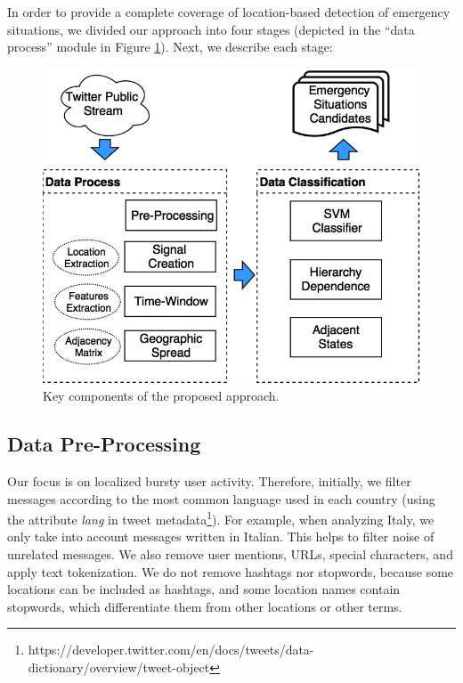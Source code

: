 \documentclass[sigconf]{acmart}
\begin{document}
In order to provide a complete coverage of location-based detection of emergency situations, we divided our approach into four stages (depicted in the ``data process'' module in Figure \ref{fig:diagram}). Next, we describe each stage:

\begin{figure}
	\centering
	\includegraphics[width=\columnwidth]{img/diagram4.png}
	\caption{Key components of the proposed approach.}
	\label{fig:diagram}
\end{figure}

\subsection{Data Pre-Processing}
 
Our focus is on localized bursty user activity. Therefore, initially, we filter messages according to the most common language used in each country (using the attribute \textit{lang} in tweet metadata\footnote{https://developer.twitter.com/en/docs/tweets/data-dictionary/overview/tweet-object}). For example, when analyzing Italy, we only take into account messages written in Italian. This helps to filter noise of unrelated messages. We also remove user mentions, URLs,  special characters, and apply text tokenization. We do not remove hashtags nor stopwords, because some locations can be included as hashtags, and some location names contain stopwords, which differentiate them from other locations or other terms.
\end{document}
